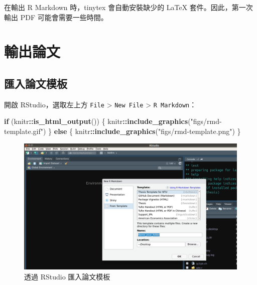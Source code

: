 \documentclass[oneside]{book}
\newenvironment{Shaded}{\begin{snugshade}}{\end{snugshade}}
\newcommand{\KeywordTok}[1]{\textcolor[rgb]{0.13,0.29,0.53}{\textbf{#1}}}
\newcommand{\StringTok}[1]{\textcolor[rgb]{0.31,0.60,0.02}{#1}}
\newcommand{\ControlFlowTok}[1]{\textcolor[rgb]{0.13,0.29,0.53}{\textbf{#1}}}
\newcommand{\OperatorTok}[1]{\textcolor[rgb]{0.81,0.36,0.00}{\textbf{#1}}}
\newcommand{\NormalTok}[1]{#1}
\theoremstyle{definition}
\theoremstyle{definition}
\theoremstyle{definition}
\theoremstyle{remark}
\begin{document}
在輸出 R Markdown 時，tinytex 會自動安裝缺少的 LaTeX
套件。因此，第一次輸出 PDF 可能會需要一些時間。

\chapter{輸出論文}\label{export-thesis}

\section{匯入論文模板}\label{import-template}

開啟 RStudio，選取左上方 \texttt{File} \textgreater{} \texttt{New\ File}
\textgreater{} \texttt{R\ Markdown}：

\begin{Shaded}
\begin{Highlighting}[]
\ControlFlowTok{if}\NormalTok{ (knitr}\OperatorTok{::}\KeywordTok{is_html_output}\NormalTok{()) \{}
\NormalTok{  knitr}\OperatorTok{::}\KeywordTok{include_graphics}\NormalTok{(}\StringTok{"figs/rmd-template.gif"}\NormalTok{)}
\NormalTok{\} }\ControlFlowTok{else}\NormalTok{ \{}
\NormalTok{  knitr}\OperatorTok{::}\KeywordTok{include_graphics}\NormalTok{(}\StringTok{"figs/rmd-template.png"}\NormalTok{)}
\NormalTok{\}}
\end{Highlighting}
\end{Shaded}

\begin{figure}[H]

{\centering \includegraphics[width=1\linewidth]{figs/rmd-template} 

}

\caption{透過 RStudio 匯入論文模板}\label{fig:unnamed-chunk-2}
\end{figure}
\end{document}
